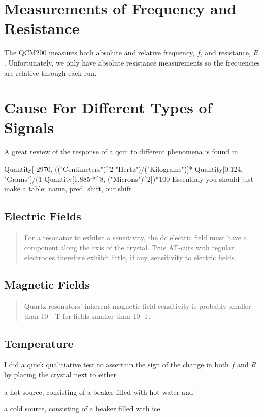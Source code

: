 \documentclass[a4paper]{article}
\begin{document}
\section{Measurements of Frequency and Resistance}
The QCM200 measures both absolute and relative frequency, $f$, and
resistance, $R$.  Unfortunately, we only have absolute resistance
measurements so the frequencies are relative through each run.

\section{Cause For Different Types of Signals}
A great review of the response of a \gls{qcm} to different phenomena is found in \cite{walls1995fundamental}

Quantity[-2970, (("Centimeters")^2 "Hertz")/("Kilograms")]*
Quantity[0.124, "Grams"]/(1 Quantity[1.885`*^8, ("Microns")^2])*100
Essentialy you should just make a table: name, pred. shift, our shift
\subsection{Electric Fields}
\begin{quote}
  For a resonator to exhibit a sensitivity, the dc electric field must have a
  component along the axis of the crystal. True AT-cuts with regular electrodes
  therefore exhibit little, if any, sensitivity to electric fields. \cite{walls1995fundamental}
\end{quote}
\subsection{Magnetic Fields}
\begin{quote}
  Quartz resonators’ inherent magnetic field sensitivity is
  probably smaller than \SI{10}{\per\tesla} for fields smaller than \SI{10}{\tesla}. \cite{walls1995fundamental}
\end{quote}


\subsection{Temperature}
I did a quick qualitiative test to assertain the sign of the change in both
$f$ and $R$ by placing the crystal next to either
\begin{inparaenum}
  \item a hot source, consisting of a beaker filled with hot water and
  \item a cold source, consisting of a beaker filled with ice
\end{inparaenum}
\end{document}
